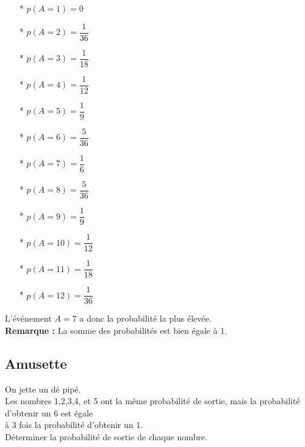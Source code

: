 \begin{itemize}
\item[*] $p\left(A = 1\right) = 0 $ \\
\item[*] $p\left(A = 2\right) = \dfrac{1}{36} $ \\
\item[*] $p\left(A = 3\right) = \dfrac{1}{18} $ \\
\item[*] $p\left(A = 4\right) = \dfrac{1}{12} $ \\
\item[*] $p\left(A = 5\right) = \dfrac{1}{9} $ \\
\item[*] $p\left(A = 6\right) = \dfrac{5}{36} $ \\
\item[*] $p\left(A = 7\right) = \dfrac{1}{6} $ \\
\item[*] $p\left(A = 8\right) = \dfrac{5}{36} $ \\
\item[*] $p\left(A = 9\right) = \dfrac{1}{9} $ \\
\item[*] $p\left(A = 10\right) = \dfrac{1}{12} $ \\
\item[*] $p\left(A = 11\right) = \dfrac{1}{18} $ \\
\item[*] $p\left(A = 12\right) = \dfrac{1}{36}  $ \\
\end{itemize}

L'événement $A=7$ a donc la probabilité la plus élevée. \\

\textbf{Remarque :} La somme des probabilités est bien égale à 1.

\newpage

\subsection{Amusette }

On jette un dé pipé. \\Les nombres 1,2,3,4, et 5 ont la même probabilité de sortie, mais la probabilité d'obtenir un 6 est égale \\ à 3 fois la probabilité d'obtenir un 1. \\

Déterminer la probabilité de sortie de chaque nombre. \\


